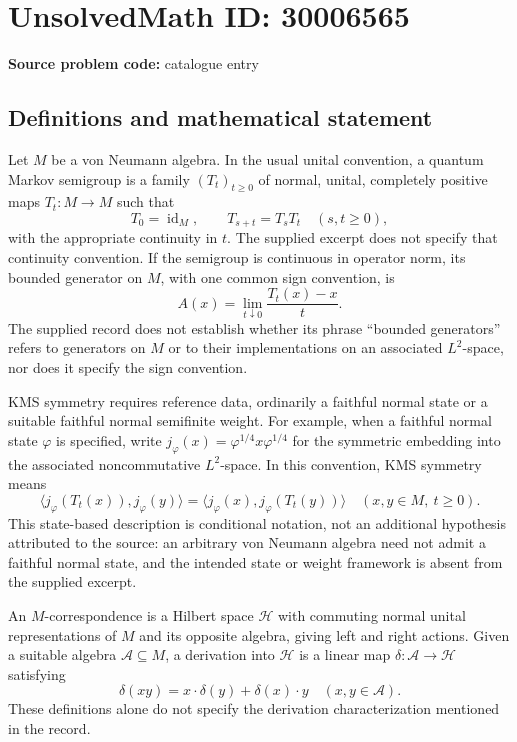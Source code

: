 \documentclass[11pt]{article}
\begin{document}
\section*{UnsolvedMath ID: 30006565}
\textbf{Source problem code:} catalogue entry
\subsection{Definitions and mathematical statement}
Let \(M\) be a von Neumann algebra. In the usual unital convention, a quantum Markov semigroup is a family \((T_t)_{t\geq 0}\) of normal, unital, completely positive maps \(T_t:M\to M\) such that
\[
T_0=\operatorname{id}_M,\qquad T_{s+t}=T_sT_t\quad(s,t\geq0),
\]
with the appropriate continuity in \(t\). The supplied excerpt does not specify that continuity convention. If the semigroup is continuous in operator norm, its bounded generator on \(M\), with one common sign convention, is
\[
A(x)=\lim_{t\downarrow0}\frac{T_t(x)-x}{t}.
\]
The supplied record does not establish whether its phrase ``bounded generators'' refers to generators on \(M\) or to their implementations on an associated \(L^2\)-space, nor does it specify the sign convention.

KMS symmetry requires reference data, ordinarily a faithful normal state or a suitable faithful normal semifinite weight. For example, when a faithful normal state \(\varphi\) is specified, write \(j_\varphi(x)=\varphi^{1/4}x\varphi^{1/4}\) for the symmetric embedding into the associated noncommutative \(L^2\)-space. In this convention, KMS symmetry means
\[
\bigl\langle j_\varphi(T_t(x)),j_\varphi(y)\bigr\rangle
=
\bigl\langle j_\varphi(x),j_\varphi(T_t(y))\bigr\rangle
\quad(x,y\in M,\ t\geq0).
\]
This state-based description is conditional notation, not an additional hypothesis attributed to the source: an arbitrary von Neumann algebra need not admit a faithful normal state, and the intended state or weight framework is absent from the supplied excerpt.

An \(M\)-correspondence is a Hilbert space \(\mathcal H\) with commuting normal unital representations of \(M\) and its opposite algebra, giving left and right actions. Given a suitable algebra \(\mathcal A\subseteq M\), a derivation into \(\mathcal H\) is a linear map \(\delta:\mathcal A\to\mathcal H\) satisfying
\[
\delta(xy)=x\cdot\delta(y)+\delta(x)\cdot y
\quad(x,y\in\mathcal A).
\]
These definitions alone do not specify the derivation characterization mentioned in the record.
\end{document}
